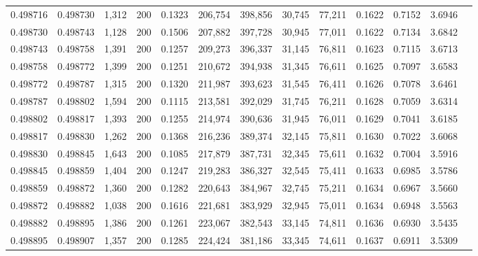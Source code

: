 \begin{tabular}{rrrrrrrrrrrrr}
0.498716 & 0.498730 & 1,312 & 200 &                                     0.1323 & 206,754 & 398,856 &  30,745 &  77,211 & 0.1622 & 0.7152 & 3.6946 \\
0.498730 & 0.498743 & 1,128 & 200 &                                     0.1506 & 207,882 & 397,728 &  30,945 &  77,011 & 0.1622 & 0.7134 & 3.6842 \\
0.498743 & 0.498758 & 1,391 & 200 &                                     0.1257 & 209,273 & 396,337 &  31,145 &  76,811 & 0.1623 & 0.7115 & 3.6713 \\
0.498758 & 0.498772 & 1,399 & 200 &                                     0.1251 & 210,672 & 394,938 &  31,345 &  76,611 & 0.1625 & 0.7097 & 3.6583 \\
0.498772 & 0.498787 & 1,315 & 200 &                                     0.1320 & 211,987 & 393,623 &  31,545 &  76,411 & 0.1626 & 0.7078 & 3.6461 \\
0.498787 & 0.498802 & 1,594 & 200 &                                     0.1115 & 213,581 & 392,029 &  31,745 &  76,211 & 0.1628 & 0.7059 & 3.6314 \\
0.498802 & 0.498817 & 1,393 & 200 &                                     0.1255 & 214,974 & 390,636 &  31,945 &  76,011 & 0.1629 & 0.7041 & 3.6185 \\
0.498817 & 0.498830 & 1,262 & 200 &                                     0.1368 & 216,236 & 389,374 &  32,145 &  75,811 & 0.1630 & 0.7022 & 3.6068 \\
0.498830 & 0.498845 & 1,643 & 200 &                                     0.1085 & 217,879 & 387,731 &  32,345 &  75,611 & 0.1632 & 0.7004 & 3.5916 \\
0.498845 & 0.498859 & 1,404 & 200 &                                     0.1247 & 219,283 & 386,327 &  32,545 &  75,411 & 0.1633 & 0.6985 & 3.5786 \\
0.498859 & 0.498872 & 1,360 & 200 &                                     0.1282 & 220,643 & 384,967 &  32,745 &  75,211 & 0.1634 & 0.6967 & 3.5660 \\
0.498872 & 0.498882 & 1,038 & 200 &                                     0.1616 & 221,681 & 383,929 &  32,945 &  75,011 & 0.1634 & 0.6948 & 3.5563 \\
0.498882 & 0.498895 & 1,386 & 200 &                                     0.1261 & 223,067 & 382,543 &  33,145 &  74,811 & 0.1636 & 0.6930 & 3.5435 \\
0.498895 & 0.498907 & 1,357 & 200 &                                     0.1285 & 224,424 & 381,186 &  33,345 &  74,611 & 0.1637 & 0.6911 & 3.5309 \\

\end{tabular}
